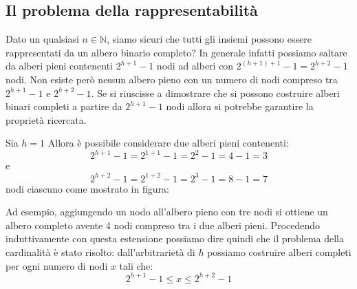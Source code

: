 \subsection{Il problema della rappresentabilità}
Dato un qualsiasi $n \in \mathbb{N}$, siamo sicuri che tutti gli insiemi possono essere rappresentati da un albero binario completo? In generale infatti possiamo saltare da alberi pieni contenenti $2^{h+1}-1$ nodi ad alberi con $2^{(h+1)+1}-1=2^{h+2}-1$ nodi. Non esiste però nessun albero pieno con un numero di nodi compreso tra $2^{h+1}-1$ e $2^{h+2}-1$. Se si riuscisse a dimostrare che si possono costruire alberi binari completi a partire da $2^{h+1}-1$ nodi allora si potrebbe garantire la proprietà ricercata.

Sia $h=1$ Allora è possibile considerare due alberi pieni contenenti:
\begin{displaymath}
	2^{h+1}-1 = 2^{1+1}-1=2^{2}-1=4-1=3
\end{displaymath}
e
\begin{displaymath}
	2^{h+2}-1 = 2^{1+2}-1=2^{3}-1=8-1=7
\end{displaymath}
nodi ciascuno come mostrato in figura:

\begin{center}
\begin{minipage}{.45\textwidth}
	\centering
\end{minipage}
\hfil
\begin{minipage}{.45\textwidth}
	\centering
\end{minipage}
\end{center}

Ad esempio, aggiungendo un nodo all'albero pieno con tre nodi si ottiene un albero completo avente 4 nodi compreso tra i due alberi pieni. Procedendo induttivamente con questa estensione possiamo dire quindi che il problema della cardinalità è stato risolto: dall'arbitrarietà di $h$ possiamo costruire alberi completi per ogni numero di nodi $x$ tali che:
\begin{displaymath}
	2^{h+1}-1 \leq x \leq 2^{h+2}-1
\end{displaymath}

